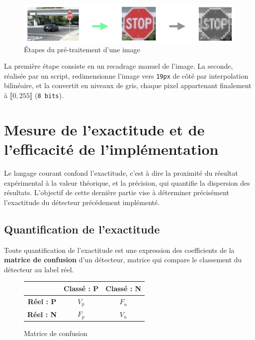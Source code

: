 \documentclass[12pt,a4paper]{article}
\begin{document}
\begin{figure}[h]
    \includegraphics[scale = 0.5]{traitement}
    \centering
    \caption{Étapes du pré-traitement d'une image}
\end{figure}

La première étape consiste en un recadrage manuel de l'image. La seconde, réalisée par un script, redimensionne l'image vers \texttt{19px} de côté par interpolation bilinéaire, et la convertit en niveaux de gris, chaque pixel appartenant finalement à $\llbracket 0, 255 \rrbracket$ (\texttt{8 bits}).

\section{Mesure de l'exactitude et de l'efficacité de l'implémentation}
Le langage courant confond l'exactitude, c'est à dire la proximité du résultat expérimental à la valeur théorique, et la précision, qui quantifie la dispersion des résultats. L'objectif de cette dernière partie vise à déterminer précisément l'exactitude du détecteur précédement implémenté.

\subsection{Quantification de l'exactitude}
Toute quantification de l'exactitude est une expression des coefficients de la \textbf{matrice de confusion} d'un détecteur, matrice qui compare le classement du détecteur au label réel.

\begin{figure}
    \renewcommand{\arraystretch}{1.5}
    \begin{tabular}{|c|c|c|}
        \cline{2-3}
        \multicolumn{1}{c|}{} & \textbf{Classé : P} & \textbf{Classé : N} \\
        \hline
        \textbf{Réel : P} & $V_p$ & $F_n$ \\
        \hline
        \textbf{Réel : N} & $F_p$ & $V_n$ \\
        \hline
    \end{tabular}
    \caption{Matrice de confusion}
    \label{fig:matrice-confusion}
\end{figure}
\end{document}
